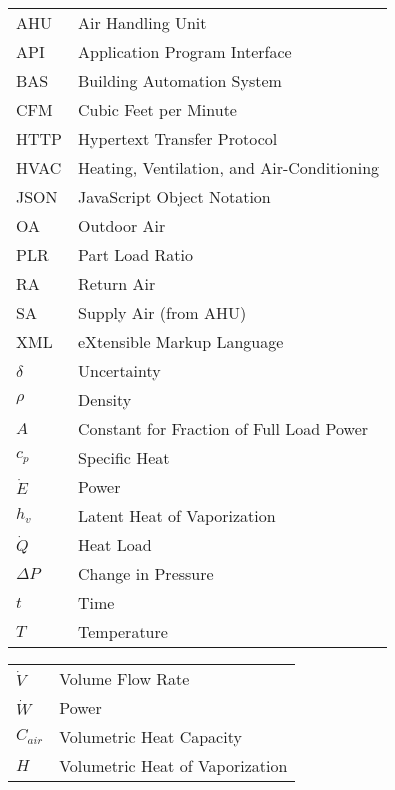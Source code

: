 \begin{tabular}{ll}
AHU          & Air Handling Unit\tabularnewline
API          & Application Program Interface                             \\
BAS          & Building Automation System\tabularnewline
CFM          & Cubic Feet per Minute                                     \\
HTTP         & Hypertext Transfer Protocol                               \\
HVAC         & Heating, Ventilation, and Air-Conditioning\tabularnewline
JSON         & JavaScript Object Notation                                \\
OA           & Outdoor Air                                               \\
PLR          & Part Load Ratio                                           \\
RA           & Return Air                                                \\
SA           & Supply Air (from AHU)                                     \\
XML          & eXtensible Markup Language                                \\
\(\delta\)   & Uncertainty                                               \\
\(\rho\)     & Density                                                   \\
\(A\)        & Constant for Fraction of Full Load Power                  \\
\(c_{p}\)    & Specific Heat                                             \\
\(\dot{E}\)  & Power                                                     \\
\(h_{v}\)    & Latent Heat of Vaporization                               \\
\( \dot{Q}\) & Heat Load                                                 \\
\(\Delta P\) & Change in Pressure                                        \\
\(t\)        & Time\tabularnewline
\(T\)        & Temperature\tabularnewline
\end{tabular}

\begin{tabular}{ll}
\(\dot{V}\) & Volume Flow Rate         \\
\(\dot{W}\) & Power                    \\
\(C_{air}\) & Volumetric Heat Capacity \\
\(H\) & Volumetric Heat of Vaporization     \\
\end{tabular}



